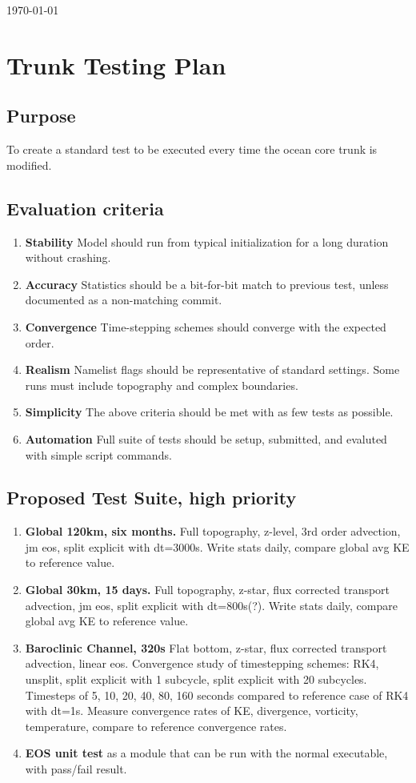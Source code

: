 \documentclass[11pt,titlepage,twoside]{article}
\begin{document}
\today
\section{Trunk Testing Plan}

\subsection{Purpose}
To create a standard test to be executed every time the ocean core trunk is modified.\\

\subsection{Evaluation criteria}
\begin{enumerate}
\item {\bf Stability} Model should run from typical initialization for a long duration without crashing.
\item {\bf Accuracy} Statistics should be a bit-for-bit match to previous test, unless documented as a non-matching commit.
\item {\bf Convergence} Time-stepping schemes should converge with the expected order.
\item {\bf Realism} Namelist flags should be representative of standard settings.  Some runs must include topography and complex boundaries.
\item {\bf Simplicity} The above criteria should be met with as few tests as possible.
\item {\bf Automation} Full suite of tests should be setup, submitted, and evaluted with simple script commands.
\end{enumerate}

\subsection{Proposed Test Suite, high priority}
\begin{enumerate}
\item {\bf Global 120km, six months.} Full topography, z-level, 3rd order advection, jm eos, split explicit with dt=3000s.  Write stats daily, compare global avg KE to reference value.
\item {\bf Global 30km, 15 days.} Full topography, z-star, flux corrected transport advection, jm eos, split explicit with dt=800s(?).  Write stats daily, compare global avg KE to reference value.
\item {\bf Baroclinic Channel, 320s} Flat bottom, z-star, flux corrected transport advection, linear eos.  Convergence study of timestepping schemes: RK4, unsplit, split explicit with 1 subcycle, split explicit with 20 subcycles.  Timesteps of 5, 10, 20, 40, 80, 160 seconds compared to reference case of RK4 with dt=1s.  Measure convergence rates of KE, divergence, vorticity, temperature, compare to reference convergence rates.
\item {\bf EOS unit test} as a module that can be run with the normal executable, with pass/fail result.
\end{enumerate}
\end{document}
